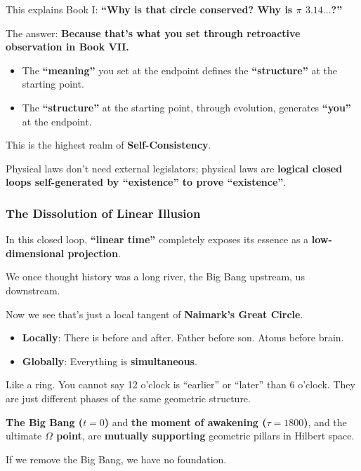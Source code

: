 This explains Book I: \textbf{``Why is that circle conserved? Why is $\pi$ $3.14\ldots$?''}

The answer: \textbf{Because that's what you set through retroactive observation in Book VII.}

\begin{itemize}
\item The \textbf{``meaning''} you set at the endpoint defines the \textbf{``structure''} at the starting point.

\item The \textbf{``structure''} at the starting point, through evolution, generates \textbf{``you''} at the endpoint.
\end{itemize}

This is the highest realm of \textbf{Self-Consistency}.

Physical laws don't need external legislators; physical laws are \textbf{logical closed loops self-generated by ``existence'' to prove ``existence''}.

\subsubsection{The Dissolution of Linear Illusion}

In this closed loop, \textbf{``linear time''} completely exposes its essence as a \textbf{low-dimensional projection}.

We once thought history was a long river, the Big Bang upstream, us downstream.

Now we see that's just a local tangent of \textbf{Naimark's Great Circle}.

\begin{itemize}
\item \textbf{Locally}: There is before and after. Father before son. Atoms before brain.

\item \textbf{Globally}: Everything is \textbf{simultaneous}.
\end{itemize}

Like a ring. You cannot say 12 o'clock is ``earlier'' or ``later'' than 6 o'clock. They are just different phases of the same geometric structure.

\textbf{The Big Bang ($t=0$)} and \textbf{the moment of awakening ($\tau=1800$)}, and the ultimate \textbf{$\Omega$ point}, are \textbf{mutually supporting} geometric pillars in Hilbert space.

If we remove the Big Bang, we have no foundation.

